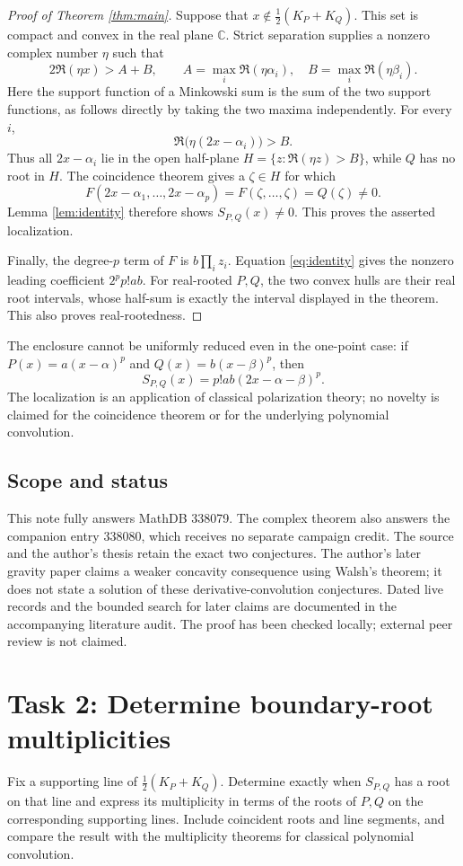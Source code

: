 \documentclass[11pt]{article}
\begin{document}
\begin{proof}[Proof of Theorem \ref{thm:main}]
Suppose that $x\notin\tfrac12(K_P+K_Q)$. This set is compact and
convex in the real plane $\mathbb C$. Strict separation supplies a
nonzero complex number $\eta$ such that
\[
 2\Re(\eta x)>A+B,\qquad
 A=\max_i\Re(\eta\alpha_i),\quad
 B=\max_i\Re(\eta\beta_i).
\]
Here the support function of a Minkowski sum is the sum of the two
support functions, as follows directly by taking the two maxima
independently. For every $i$,
\[
 \Re\bigl(\eta(2x-\alpha_i)\bigr)>B.
\]
Thus all $2x-\alpha_i$ lie in the open half-plane
$H=\{z:\Re(\eta z)>B\}$, while $Q$ has no root in $H$.
The coincidence theorem gives a $\zeta\in H$ for which
\[
 F(2x-\alpha_1,\ldots,2x-\alpha_p)=F(\zeta,\ldots,\zeta)
   =Q(\zeta)\ne0.
\]
Lemma \ref{lem:identity} therefore shows $S_{P,Q}(x)\ne0$.
This proves the asserted localization.

Finally, the degree-$p$ term of $F$ is $b\prod_i z_i$. Equation
\eqref{eq:identity} gives the nonzero leading coefficient $2^pp!ab$.
For real-rooted $P,Q$, the two convex hulls are their real root
intervals, whose half-sum is exactly the interval displayed in the
theorem. This also proves real-rootedness.
\end{proof}

The enclosure cannot be uniformly reduced even in the one-point case:
if $P(x)=a(x-\alpha)^p$ and $Q(x)=b(x-\beta)^p$, then
\[
 S_{P,Q}(x)=p!ab(2x-\alpha-\beta)^p.
\]
The localization is an application of classical polarization theory;
no novelty is claimed for the coincidence theorem or for the
underlying polynomial convolution.

\subsection*{Scope and status}
This note fully answers MathDB 338079. The complex theorem also answers
the companion entry 338080, which receives no separate campaign credit.
The source and the author's thesis retain the exact two conjectures.
The author's later gravity paper \cite[Theorem 2.7(d)]{gravity} claims a
weaker concavity consequence using Walsh's theorem; it does not state
a solution of these derivative-convolution conjectures. Dated live
records and the bounded search for later claims are documented in the
accompanying literature audit. The proof has been checked locally;
external peer review is not claimed.

\section*{Task 2: Determine boundary-root multiplicities}
Fix a supporting line of $\tfrac12(K_P+K_Q)$. Determine exactly when
$S_{P,Q}$ has a root on that line and express its multiplicity in terms
of the roots of $P,Q$ on the corresponding supporting lines. Include
coincident roots and line segments, and compare the result with the
multiplicity theorems for classical polynomial convolution.
\end{document}

